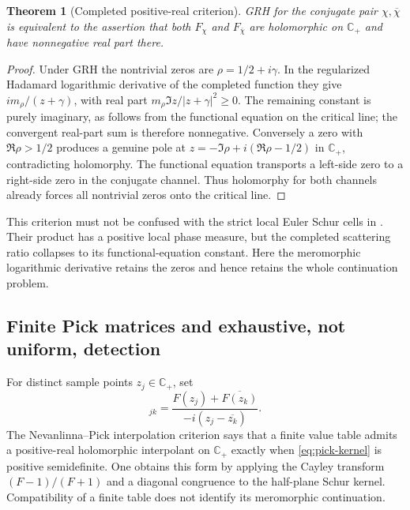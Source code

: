 \documentclass[11pt]{article}
\newtheorem{theorem}{Theorem}[section]
\theoremstyle{definition}
\theoremstyle{remark}
\newcommand{\C}{\mathbb C}
\begin{document}
\begin{theorem}[Completed positive-real criterion]
\label{thm:pick-GRH}
GRH for the conjugate pair $\chi,\overline\chi$ is equivalent to the
assertion that both $F_\chi$ and $F_{\overline\chi}$ are holomorphic
on $\C_+$ and have nonnegative real part there.
\end{theorem}

\begin{proof}
Under GRH the nontrivial zeros are $\rho=1/2+i\gamma$.
In the regularized Hadamard logarithmic derivative of the completed
function they give
$im_\rho/(z+\gamma)$, with real part
$m_\rho\Im z/|z+\gamma|^2\ge0$.
The remaining constant is purely imaginary, as follows from the
functional equation on the critical line; the convergent real-part
sum is therefore nonnegative.
Conversely a zero with $\Re\rho>1/2$ produces a genuine pole at
$z=-\Im\rho+i(\Re\rho-1/2)$ in $\C_+$, contradicting holomorphy.
The functional equation transports a left-side zero to a right-side
zero in the conjugate channel.  Thus holomorphy for both channels
already forces all nontrivial zeros onto the critical line.
\end{proof}

This criterion must not be confused with the strict local Euler Schur
cells in .  Their product has a positive local
phase measure, but the completed scattering ratio collapses to its
functional-equation constant.  Here the meromorphic logarithmic
derivative retains the zeros and hence retains the whole continuation
problem.

\subsection{Finite Pick matrices and exhaustive, not uniform, detection}

For distinct sample points $z_j\in\C_+$, set
\begin{equation}
 [\mathsf K_Z(F)]_{jk}
 =\frac{F(z_j)+\overline{F(z_k)}}{-i(z_j-\overline{z_k})}.
 \label{eq:pick-kernel}
\end{equation}
The Nevanlinna--Pick interpolation criterion says that a finite value
table admits a positive-real holomorphic interpolant on $\C_+$ exactly
when \eqref{eq:pick-kernel} is positive semidefinite.  One obtains this
form by applying the Cayley transform $(F-1)/(F+1)$ and a diagonal
congruence to the half-plane Schur kernel.  Compatibility of a finite
table does not identify its meromorphic continuation.
\end{document}
